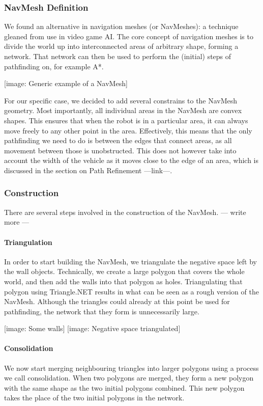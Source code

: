 \documentclass[10pt,twocolumn]{scrartcl}
\begin{document}
\subsubsection{NavMesh Definition}
We found an alternative in navigation meshes (or NavMeshes): a technique gleaned from use in video game AI. The core concept of navigation meshes is to divide the world up into interconnected areas of arbitrary shape, forming a network. That network can then be used to perform the (initial) steps of pathfinding on, for example A*.

[image: Generic example of a NavMesh]

For our specific case, we decided to add several constrains to the NavMesh geometry. Most importantly, all individual areas in the NavMesh are convex shapes. This ensures that when the robot is in a particular area, it can always move freely to any other point in the area. Effectively, this means that the only pathfinding we need to do is between the edges that connect areas, as all movement between those is unobstructed. This does not however take into account the width of the vehicle as it moves close to the edge of an area, which is discussed in the section on Path Refinement ---link---. 

\subsubsection{Construction}
There are several steps involved in the construction of the NavMesh. --- write more ---

\paragraph{Triangulation}
In order to start building the NavMesh, we triangulate the negative space left by the wall objects. Technically, we create a large polygon that covers the whole world, and then add the walls into that polygon as holes. Triangulating that polygon using Triangle.NET results in what can be seen as a rough version of the NavMesh. Although the triangles could already at this point be used for pathfinding, the network that they form is unnecessarily large.

[image: Some walls] [image: Negative space triangulated]

\paragraph{Consolidation}
We now start merging neighbouring triangles into larger polygons using a process we call consolidation. When two polygons are merged, they form a new polygon with the same shape as the two initial polygons combined. This new polygon takes the place of the two initial polygons in the network.
\end{document}
